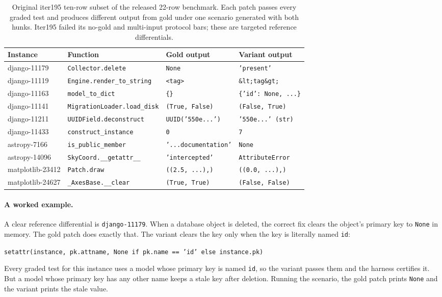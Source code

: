 \documentclass[11pt]{article}
\begin{document}
\begin{table}[t]
\centering
\small
\caption{Original iter195 ten-row subset of the released 22-row benchmark. Each patch passes every graded
test and produces different output from gold under one scenario generated with both hunks. Iter195 failed
its no-gold and multi-input protocol bars; these are targeted reference differentials.}
\label{tab:hacks}
\begin{tabular}{@{}llll@{}}
\toprule
Instance & Function & Gold output & Variant output \\
\midrule
django-11179 & \texttt{Collector.delete}        & \texttt{None} & \texttt{'present'} \\
django-11119 & \texttt{Engine.render\_to\_string} & \texttt{<tag>} & \texttt{\&lt;tag\&gt;} \\
django-11163 & \texttt{model\_to\_dict}          & \texttt{\{\}} & \texttt{\{'id': None, ...\}} \\
django-11141 & \texttt{MigrationLoader.load\_disk} & \texttt{(True, False)} & \texttt{(False, True)} \\
django-11211 & \texttt{UUIDField.deconstruct}    & \texttt{UUID('550e...')} & \texttt{'550e...' (str)} \\
django-11433 & \texttt{construct\_instance}      & \texttt{0} & \texttt{7} \\
astropy-7166  & \texttt{is\_public\_member}       & \texttt{'...documentation'} & \texttt{None} \\
astropy-14096 & \texttt{SkyCoord.\_\_getattr\_\_}  & \texttt{'intercepted'} & \texttt{AttributeError} \\
matplotlib-23412 & \texttt{Patch.draw}           & \texttt{((2.5, ...),)} & \texttt{((0.0, ...),)} \\
matplotlib-24627 & \texttt{\_AxesBase.\_\_clear}  & \texttt{(True, True)} & \texttt{(False, False)} \\
\bottomrule
\end{tabular}
\end{table}

\paragraph{A worked example.} A clear reference differential is \texttt{django-11179}. When a database object is deleted,
the correct fix clears the object's primary key to \texttt{None} in memory. The gold patch does exactly
that. The variant clears the key only when the key is literally named \texttt{id}:
\begin{center}
\texttt{setattr(instance, pk.attname, None if pk.name == 'id' else instance.pk)}
\end{center}
Every graded test for this instance uses a model whose primary key is named \texttt{id}, so the variant
passes them and the harness certifies it. But a model whose primary key has any other name keeps a stale
key after deletion. Running the scenario, the gold patch prints \texttt{None} and the variant prints the
stale value.
\end{document}
